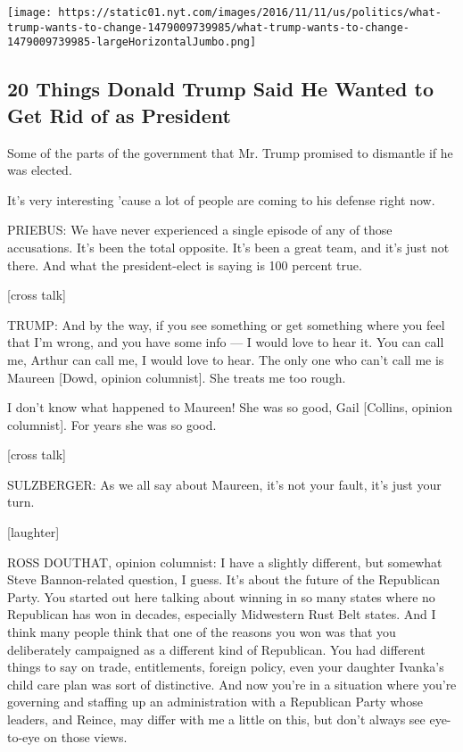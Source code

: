 \texttt{[image: https://static01.nyt.com/images/2016/11/11/us/politics/what-trump-wants-to-change-1479009739985/what-trump-wants-to-change-1479009739985-largeHorizontalJumbo.png]}

\hypertarget{20-things-donald-trump-said-he-wanted-to-get-rid-of-as-president}{%
\subsection{20 Things Donald Trump Said He Wanted to Get Rid of as
President}\label{20-things-donald-trump-said-he-wanted-to-get-rid-of-as-president}}

Some of the parts of the government that Mr. Trump promised to dismantle
if he was elected.

It's very interesting 'cause a lot of people are coming to his defense
right now.

PRIEBUS: We have never experienced a single episode of any of those
accusations. It's been the total opposite. It's been a great team, and
it's just not there. And what the president-elect is saying is 100
percent true.

{[}cross talk{]}

TRUMP: And by the way, if you see something or get something where you
feel that I'm wrong, and you have some info --- I would love to hear it.
You can call me, Arthur can call me, I would love to hear. The only one
who can't call me is Maureen {[}Dowd, opinion columnist{]}. She treats
me too rough.

I don't know what happened to Maureen! She was so good, Gail {[}Collins,
opinion columnist{]}. For years she was so good.

{[}cross talk{]}

SULZBERGER: As we all say about Maureen, it's not your fault, it's just
your turn.

{[}laughter{]}

ROSS DOUTHAT, opinion columnist: I have a slightly different, but
somewhat Steve Bannon-related question, I guess. It's about the future
of the Republican Party. You started out here talking about winning in
so many states where no Republican has won in decades, especially
Midwestern Rust Belt states. And I think many people think that one of
the reasons you won was that you deliberately campaigned as a different
kind of Republican. You had different things to say on trade,
entitlements, foreign policy, even your daughter Ivanka's child care
plan was sort of distinctive. And now you're in a situation where you're
governing and staffing up an administration with a Republican Party
whose leaders, and Reince, may differ with me a little on this, but
don't always see eye-to-eye on those views.

